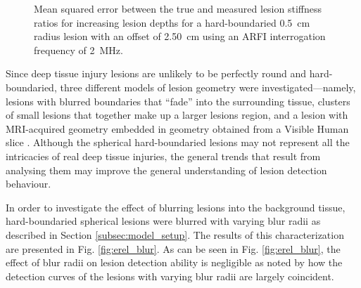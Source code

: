 			\begin{figure}[!htb]
				\centering
				\caption[Shear-wave speed quantified mean squared error related to lesion depth]{Mean squared error between the true and measured lesion stiffness ratios for increasing lesion depths for a hard-boundaried \SI{0.5}{cm} radius lesion with an offset of \SI{2.50}{\cm} using an ARFI interrogation frequency of \SI{2}{\MHz}.}
				\label{fig:erel_depth_mse_o250}
			\end{figure}

			Since deep tissue injury lesions are unlikely to be perfectly round and hard-boundaried, three different models of lesion geometry were investigated---namely, lesions with blurred boundaries that ``fade'' into the surrounding tissue, clusters of small lesions that together make up a larger lesions region, and a lesion with MRI-acquired geometry \cite{solis13} embedded in geometry obtained from a Visible Human slice \cite{visiblehuman}. Although the spherical hard-boundaried lesions may not represent all the intricacies of real deep tissue injuries, the general trends that result from analysing them may improve the general understanding of lesion detection behaviour.

			In order to investigate the effect of blurring lesions into the background tissue, hard-boundaried spherical lesions were blurred with varying blur radii as described in Section \ref{subsec:model_setup}. The results of this characterization are presented in Fig. \ref{fig:erel_blur}. As can be seen in Fig. \ref{fig:erel_blur}, the effect of blur radii on lesion detection ability is negligible as noted by how the detection curves of the lesions with varying blur radii are largely coincident.

